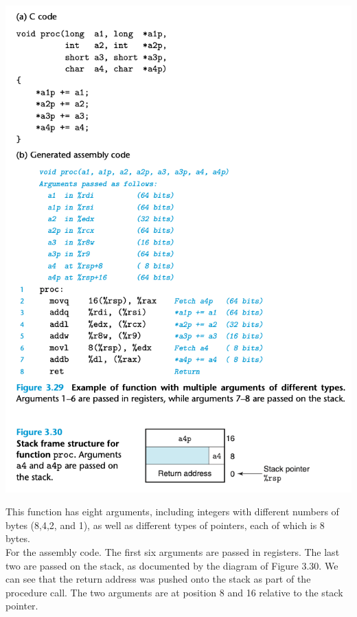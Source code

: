 \documentclass[11pt]{article}
\begin{document}
\begin{center}
\includegraphics[width=.9\linewidth]{pics/example-of-function-with-multiple-arguments-of-different-types.png}
\end{center}

This function has eight arguments, including integers with different numbers of bytes (8,4,2, and 1), as well as different types of pointers, each of which is 8 bytes.\\

For the assembly code. The first six arguments are passed in registers. The last two are passed on the stack, as documented by the diagram of Figure 3.30. We can see that the return address was pushed onto the stack as part of the procedure call. The two arguments are at position 8 and 16 relative to the stack pointer.\\
\end{document}
